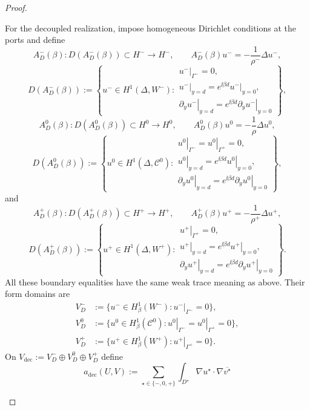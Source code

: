 \begin{proof}
\begin{enumerate}[label=\textit{Step \arabic*.},leftmargin=*]
For the decoupled realization, impose homogeneous Dirichlet conditions at the
ports and define
\[
  A_D^- (\beta):D(A_D^-(\beta))\subset H^-\longrightarrow H^- ,
  \qquad A_D^-(\beta)u^-=-\frac1{\rho^-}\Delta u^- ,
\]
\[
  D(A_D^-(\beta)):=\left\{u^-\in H^1(\Delta,W^-):
  \begin{array}{l}
    \left.u^-\right|_{\Gamma^-}=0,\\
    \left.u^-\right|_{y=d}
      =e^{\ii\beta d}\left.u^-\right|_{y=0},\\[-1mm]
    \left.\partial_yu^-\right|_{y=d}
      =e^{\ii\beta d}\left.\partial_yu^-\right|_{y=0}
  \end{array}\right\},
\]
\[
  A_D^0(\beta):D(A_D^0(\beta))\subset H^0\longrightarrow H^0,
  \qquad A_D^0(\beta)u^0=-\frac1\rho\Delta u^0,
\]
\[
  D(A_D^0(\beta)):=\left\{u^0\in H^1(\Delta,\mathcal C^0):
  \begin{array}{l}
    \left.u^0\right|_{\Gamma^-}
      =\left.u^0\right|_{\Gamma^+}=0,\\
    \left.u^0\right|_{y=d}
      =e^{\ii\beta d}\left.u^0\right|_{y=0},\\[-1mm]
    \left.\partial_yu^0\right|_{y=d}
      =e^{\ii\beta d}\left.\partial_yu^0\right|_{y=0}
  \end{array}\right\},
\]
and
\[
  A_D^+(\beta):D(A_D^+(\beta))\subset H^+\longrightarrow H^+,
  \qquad A_D^+(\beta)u^+=-\frac1{\rho^+}\Delta u^+,
\]
\[
  D(A_D^+(\beta)):=\left\{u^+\in H^1(\Delta,W^+):
  \begin{array}{l}
    \left.u^+\right|_{\Gamma^+}=0,\\
    \left.u^+\right|_{y=d}
      =e^{\ii\beta d}\left.u^+\right|_{y=0},\\[-1mm]
    \left.\partial_yu^+\right|_{y=d}
      =e^{\ii\beta d}\left.\partial_yu^+\right|_{y=0}
  \end{array}\right\}.
\]
All these boundary equalities have the same weak trace meaning as above.  Their
form domains are
\[
\begin{aligned}
  V_D^-&:=\{u^-\in H^1_\beta(W^-):
    \left.u^-\right|_{\Gamma^-}=0\},\\
  V_D^0&:=\{u^0\in H^1_\beta(\mathcal C^0):
    \left.u^0\right|_{\Gamma^-}
    =\left.u^0\right|_{\Gamma^+}=0\},\\
  V_D^+&:=\{u^+\in H^1_\beta(W^+):
    \left.u^+\right|_{\Gamma^+}=0\}.
\end{aligned}
\]
On $V_{\mathrm{dec}}:=V_D^-\oplus V_D^0\oplus V_D^+$ define
\[
  a_{\mathrm{dec}}(U,V)
  :=\sum_{\star\in\{-,0,+\}}
    \int_{D^\star}\nabla u^\star\cdot\nabla\overline{v^\star}
\]
\end{enumerate}
\end{proof}
